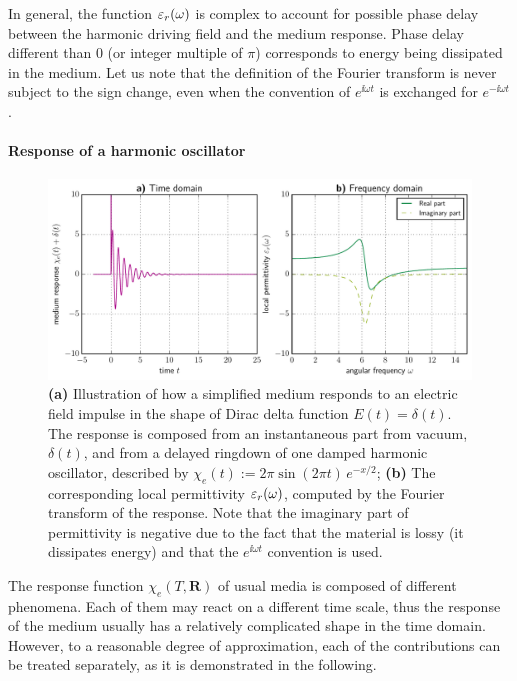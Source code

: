 In general, the function $\varepsilon_r(\omega)$ is complex to account for possible phase delay between the harmonic driving field and the medium response. Phase delay different than $0$ (or integer multiple of $\pi$) corresponds to energy being dissipated in the medium.
Let us note that the definition of the Fourier transform is never subject to the sign change, even when the convention of $e^{\ii \omega t}$ is exchanged for $e^{-\ii \omega t}$.
\paragraph{Response of a harmonic oscillator} \label{chap_lorentzmedia} %
\begin{figure}[t] \caption{\textbf{(a)} Illustration of how a simplified medium responds to an electric field impulse in the shape of Dirac delta function  $E(t) = \delta(t)$. The response is composed from an instantaneous part from vacuum, $\delta(t)$, and from a delayed ringdown of one damped harmonic oscillator, described by $\chi_e(t) := 2\pi \sin(2\pi t)\,e^{-x/2}$; \textbf{(b)} The corresponding local permittivity $\varepsilon_r(\omega)$, computed by the Fourier transform of the response. Note that the imaginary part of permittivity is negative due to the fact that the material is lossy (it dissipates energy) and that the $e^{\ii\omega t}$ convention is used.} \label{fg_oscillator_spectrum} \centering 
	\includegraphics[width=\textwidth]{img/oscillator_spectrum.pdf}
\end{figure}
The response function $\chi_e(T, \mathbf{R})$ of usual media is composed of different phenomena.  Each of them may react on a different time scale, thus the response of the medium usually has a relatively complicated shape in the time domain.  However, to a reasonable degree of approximation, each of the contributions can be treated separately, as it is demonstrated in the following.

